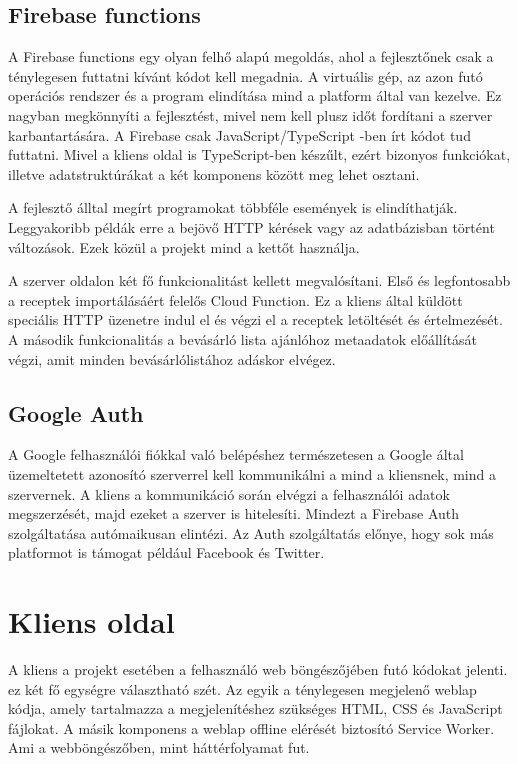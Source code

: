 \documentclass[12pt]{report}
\theoremstyle{definition}
\begin{document}
\subsection{Firebase functions}
A Firebase functions egy olyan felhő alapú megoldás, ahol a fejlesztőnek csak a ténylegesen futtatni kívánt kódot kell megadnia. A virtuális gép, az azon futó operációs rendszer és a program elindítása mind a platform által van kezelve. Ez nagyban megkönnyíti a fejlesztést, mivel nem kell plusz időt fordítani a szerver karbantartására. A Firebase csak JavaScript/TypeScript -ben írt kódot tud futtatni. Mivel a kliens oldal is TypeScript-ben készűlt, ezért bizonyos funkciókat, illetve adatstruktúrákat a két komponens között meg lehet osztani. 

A fejlesztő álltal megírt programokat többféle események is elindíthatják. Leggyakoribb példák erre a bejövő HTTP kérések vagy az adatbázisban történt változások. Ezek közül a projekt mind a kettőt használja. 

A szerver oldalon két fő funkcionalitást kellett megvalósítani. Első és legfontosabb a receptek importálásáért felelős Cloud Function. Ez a kliens által küldött speciális HTTP üzenetre indul el és végzi el a receptek letöltését és értelmezését. A második funkcionalitás a bevásárló lista ajánlóhoz metaadatok előállítását végzi, amit minden bevásárlólistához adáskor elvégez.

\subsection{Google Auth}
A Google felhasználói fiókkal való belépéshez természetesen a Google által üzemeltetett azonosító szerverrel kell kommunikálni a mind a kliensnek, mind a szervernek. A kliens a kommunikáció során elvégzi a felhasználói adatok megszerzését, majd ezeket a szerver is hitelesíti. Mindezt a Firebase Auth szolgáltatása autómaikusan elintézi. Az Auth szolgáltatás előnye, hogy sok más platformot is támogat például Facebook és Twitter. 

\section{Kliens oldal}
A kliens a projekt esetében a felhasználó web böngészőjében futó kódokat jelenti. ez két fő egységre választható szét. Az egyik a ténylegesen megjelenő weblap kódja, amely tartalmazza a megjelenítéshez szükséges HTML, CSS és JavaScript fájlokat. A másik komponens a weblap offline elérését biztosító Service Worker. Ami a webböngészőben, mint háttérfolyamat fut.
\end{document}

